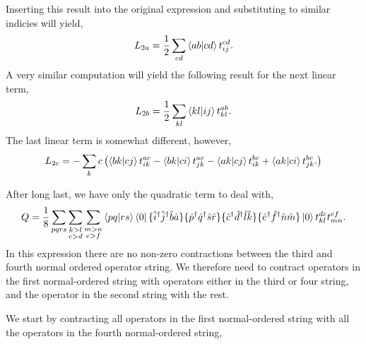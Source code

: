 Inserting this result into the original expression and substituting to similar indicies
will yield,
\begin{equation}
    L_{2a} = \frac{1}{2} \sum_{cd}\bra{ab} \ket{cd} t^{cd}_{ij}.
\end{equation}
A very similar computation will yield the following result for the next linear term,
\begin{equation}
    L_{2b} = \frac{1}{2} \sum_{kl} \bra{kl} \ket{ij} t^{ab}_{kl}.
\end{equation}
The last linear term is somewhat different, however,
\begin{equation}
    L_{2c} = - \sum_kc \left( 
        \bra{bk} \ket{cj} t^{ac}_{ik}
       -\bra{bk} \ket{ci} t^{ac}_{jk} 
       -\bra{ak} \ket{cj} t^{bc}_{ik}
       +\bra{ak} \ket{ci} t^{bc}_{jk}. 
    \right)
\end{equation}

After long last, we have only the quadratic term to deal with,
\begin{equation}
    Q = \frac{1}{8}\sum_{pqrs}\sum_{\substack{k>l \\ c>d}} \sum_{\substack{m>n \\ e>f}}
        \bra{pq} \ket{rs} \bra{0}
            \{\hat{i}^\dagger \hat{j}^\dagger \hat{b} \hat{a} \}
            \{\hat{p}^\dagger \hat{q}^\dagger \hat{s} \hat{r} \}
            \{\hat{c}^\dagger \hat{d}^\dagger \hat{l} \hat{k} \}
            \{\hat{e}^\dagger \hat{f}^\dagger \hat{n} \hat{m} \}
        \ket{0} t^{dc}_{kl} t^{ef}_{mn}.
\end{equation}
In this expression there are no non-zero contractions between the third and 
fourth normal ordered operator string. We therefore need to contract operators 
in the first normal-ordered string with operators either in the third or four 
string, and the operator in the second string with the rest. 

We start by contracting all operators in the first normal-ordered string 
with all the operators in the fourth normal-ordered string,

